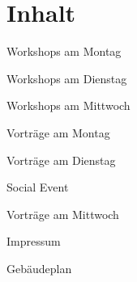 \section*{Inhalt}

\vspace*{0.35em}%
\noindent Workshops am Montag \dotfill \pageref{montag-workshops}

\vspace*{0.35em}%
\noindent Workshops am Dienstag \dotfill \pageref{dienstag-workshops}

\vspace*{0.35em}%
\noindent Workshops am Mittwoch \dotfill \pageref{mittwoch-workshops}

\vspace*{0.35em}%
\noindent Vorträge am Montag \dotfill \pageref{montag}

\vspace*{0.35em}%
\noindent Vorträge am Dienstag \dotfill \pageref{dienstag}

\vspace*{0.35em}%
\noindent Social Event \dotfill %

\vspace*{0.35em}%
\noindent Vorträge am Mittwoch %

\vspace*{0.35em}%
\noindent Impressum \dotfill %

\vspace*{0.35em}%
\noindent Gebäudeplan \dotfill %
